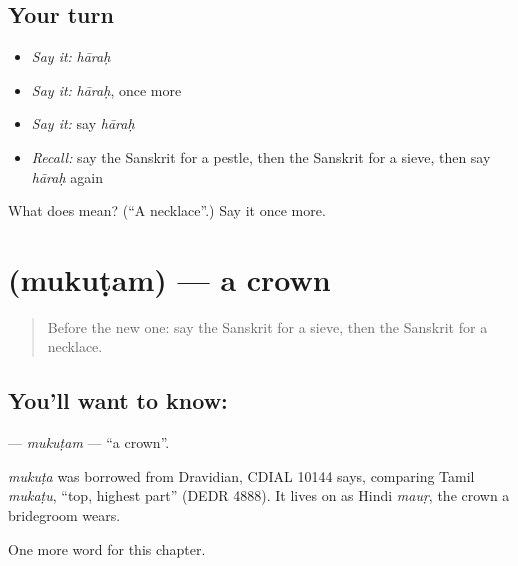 \subsection*{Your turn}
\begin{itemize}
\raggedright
  \item \emph{Say it:} \emph{hāraḥ}
  \item \emph{Say it:} \emph{hāraḥ}, once more
  \item \emph{Say it:} say \emph{hāraḥ}
  \item \emph{Recall:} say the Sanskrit for a pestle, then the Sanskrit for a sieve, then say \emph{hāraḥ} again
\end{itemize}

\begin{tcolorbox}[breakable,colback=teal!4,colframe=teal!35!black,title={Before you move on}]
What does  mean? (\textquotedblleft{}A necklace\textquotedblright{}.) Say it once more.
\end{tcolorbox}
\section[\texorpdfstring{\sk{मुकुटम्} (mukuṭam)}{मुकुटम् (mukuṭam)}]{ (mukuṭam) — a crown}

\label{lesson:SA-C192-mukutam}



\begin{quote}
Before the new one: say the Sanskrit for a sieve, then the Sanskrit for a necklace.
\end{quote}

\subsection*{You'll want to know: }
\textbf{} — \emph{mukuṭam} — \textquotedblleft{}a crown\textquotedblright{}.

\begin{cousinweb}
\emph{mukuṭa} was borrowed from Dravidian, CDIAL 10144 says, comparing Tamil \emph{mukaṭu}, \textquotedblleft{}top, highest part\textquotedblright{} (DEDR 4888). It lives on as Hindi \emph{mauṛ}, the crown a bridegroom wears.
\end{cousinweb}

\begin{grammarlens}[title={What you've built}]
One more word for this chapter.
\end{grammarlens}

